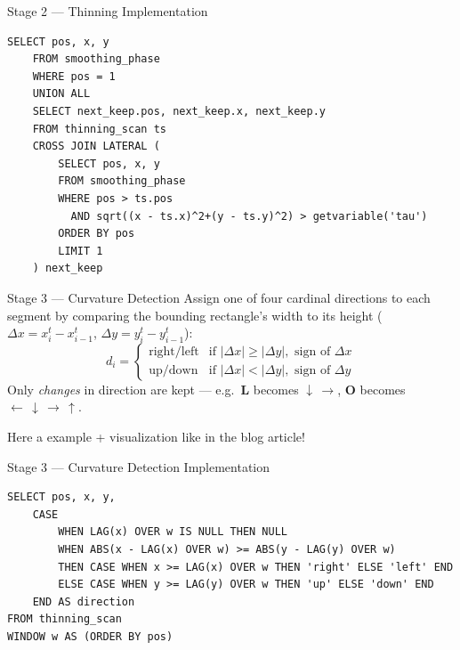 \documentclass[aspectratio=169, 12pt]{beamer}
\begin{document}
\begin{frame}[fragile]{Stage 2 — Thinning Implementation}
  \begin{lstlisting}[basicstyle=\ttfamily\footnotesize]
    SELECT pos, x, y
    FROM smoothing_phase
    WHERE pos = 1
    UNION ALL
    SELECT next_keep.pos, next_keep.x, next_keep.y
    FROM thinning_scan ts
    CROSS JOIN LATERAL (
        SELECT pos, x, y
        FROM smoothing_phase
        WHERE pos > ts.pos
          AND sqrt((x - ts.x)^2+(y - ts.y)^2) > getvariable('tau')
        ORDER BY pos
        LIMIT 1
    ) next_keep
  \end{lstlisting}
\end{frame}

\begin{frame}[fragile]{Stage 3 — Curvature Detection}
  Assign one of four cardinal directions to each segment by comparing
  the bounding rectangle's width to its height
  ($\Delta x = x^t_i - x^t_{i-1}$, $\Delta y = y^t_i - y^t_{i-1}$):
  \[
    d_i =
    \begin{cases}
      \text{right} / \text{left} & \text{if } |\Delta x| \geq |\Delta y|,
                                   \text{ sign of } \Delta x \\[2pt]
      \text{up} / \text{down}    & \text{if } |\Delta x| < |\Delta y|,
                                   \text{ sign of } \Delta y
    \end{cases}
  \]
  Only \emph{changes} in direction are kept — e.g.\ \textbf{L} becomes
  $\downarrow\,\rightarrow$, \textbf{O} becomes
  $\leftarrow\,\downarrow\,\rightarrow\,\uparrow$.

  \alert{Here a example + visualization like in the blog article!}
\end{frame}

\begin{frame}[fragile]{Stage 3 — Curvature Detection Implementation}
  \begin{lstlisting}[basicstyle=\ttfamily\footnotesize]
SELECT pos, x, y,
    CASE
        WHEN LAG(x) OVER w IS NULL THEN NULL
        WHEN ABS(x - LAG(x) OVER w) >= ABS(y - LAG(y) OVER w)
        THEN CASE WHEN x >= LAG(x) OVER w THEN 'right' ELSE 'left' END
        ELSE CASE WHEN y >= LAG(y) OVER w THEN 'up' ELSE 'down' END
    END AS direction
FROM thinning_scan
WINDOW w AS (ORDER BY pos)
  \end{lstlisting}
\end{frame}
\end{document}
